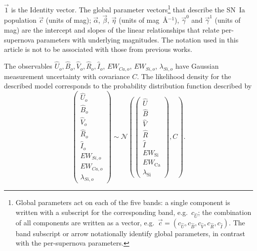 \documentclass[trackchanges]{aastex62}   	%
\begin{document}
$\vec{1}$ is the Identity vector.
The global parameter vectors\footnote{Global parameters act on each of the five bands: a single component is written with a subscript for the corresponding band, e.g.\  $c_{\hat{U}}$; 
the combination of all components are written as a vector, e.g.\ $\vec{c}=(c_{\hat{U}}, c_{\hat{B}}, c_{\hat{V}}, c_{\hat{R}}, c_{\hat{I}}) $.  The
band subscript or arrow
notationally identify global parameters, in contrast with the per-supernova parameters.
} that describe the SN~Ia population
$\vec{c}$  (units of mag);
$\vec{\alpha}$, $\vec{\beta}$,
$\vec{\eta}$ (units of mag~\AA$^{-1}$), $\vec{\gamma}^0$ and $\vec{\gamma}^1$ (units of mag)
 are the intercept
and slopes
of the linear relationships that
relate
per-supernova
parameters with 
underlying magnitudes.
The notation used in this article is not to be associated with those from previous works.


The observables
$\hat{U}_o, {\hat{B}}_o, {\hat{V}}_o, {\hat{R}}_o, {\hat{I}}_o$, $EW_{Ca,o}$, $EW_{Si,o}$, $\lambda_{Si,o}$
have Gaussian measurement uncertainty with covariance $C$.
The
likelihood density for the described model
corresponds to the probability distribution function described by
\begin{equation}
\begin{pmatrix}
{\hat{U}}_o\\{\hat{B}}_o\\ {\hat{V}}_o\\{\hat{R}}_o\\{\hat{I}}_o\\EW_{Si, o}\\ EW_{Ca, o} \\ \lambda_{Si, o}
\end{pmatrix}
\sim \mathcal{N}
\left(
\begin{pmatrix}
{\hat{U}}  \\{\hat{B}}  \\
{\hat{V}}\\{\hat{R}}\\{\hat{I}}\\
EW_{\mathrm{Si}}\\ EW_{\mathrm{Ca}} \\ \lambda_{\mathrm{Si}}
\end{pmatrix}
,C
\right).
\label{dust:eqn}
\end{equation}
\end{document}
